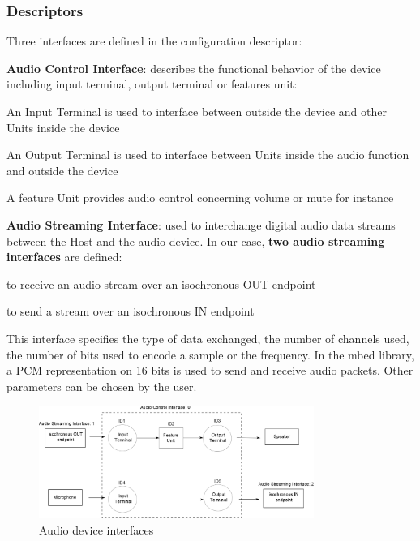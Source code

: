 \documentclass[pdftex,10pt,a4paper]{report}
\newenvironment{packed_item}{
\begin{itemize}
  \setlength{\itemsep}{1pt}
  \setlength{\parskip}{0pt}
  \setlength{\parsep}{0pt}
}{\end{itemize}}
\begin{document}
\subsubsection{Descriptors}
Three interfaces are defined in the configuration descriptor:
\begin{packed_item}
	\item \textbf{Audio Control Interface}: describes the functional behavior of the device including input terminal, output terminal or features unit:
	\begin{packed_item}
		\item An Input Terminal is used to interface between outside the device and other Units inside the device
		\item An Output Terminal is used to interface between Units inside the audio function and outside the device
		\item A feature Unit provides audio control concerning volume or mute for instance
	\end{packed_item}
	
	\item \textbf{Audio Streaming Interface}: used to interchange digital audio data streams between the Host and the audio device. In our case, \textbf{two audio streaming interfaces} are defined:
	\begin{packed_item}
		\item to receive an audio stream over an isochronous OUT endpoint
		\item to send a stream over an isochronous IN endpoint
	\end{packed_item}
	This interface specifies the type of data exchanged, the number of channels used, the number of bits used to encode a sample or the frequency. In the mbed library, a PCM representation on 16 bits is used to send and receive audio packets. Other parameters can be chosen by the user.
\end{packed_item}

\begin{figure}[h!]
		\centering
		\includegraphics[width=0.8\textwidth]{./audio_archi.jpg}
		\caption{Audio device interfaces}
		\label{Audio device interfaces}
\end{figure}
\end{document}
